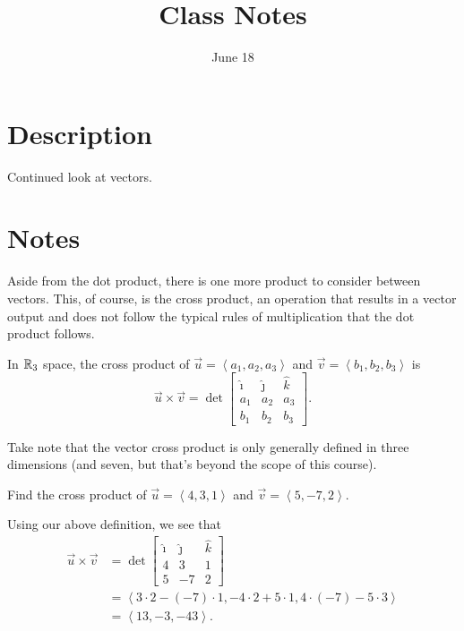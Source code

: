 \documentclass[12pt]{scrartcl}
\title{Class Notes}
\date{June 18}
\begin{document}
\maketitle

\pagebreak

\section{Description}

Continued look at vectors.

\section{Notes}

Aside from the dot product, there is one more product to consider between vectors. This, of course, is the cross product, an operation that results in a vector output and does not follow the typical rules of multiplication that the dot product follows.

\begin{definition}
    In $\mathbb R_{3}$ space, the cross product of $\vec{u} = \left<a_{1}, a_{2}, a_{3}\right>$ and $\vec{v} = \left<b_{1}, b_{2}, b_{3}\right>$ is
    \[\vec{u} \times \vec{v} = \det \begin{bmatrix} \hat{\imath} & \hat{\jmath} & \hat{k} \\ a_{1} & a_{2} & a_{3} \\ b_{1} & b_{2} & b_{3} \end{bmatrix}.\]
\end{definition}

\begin{remark}
    Take note that the vector cross product is only generally defined in three dimensions (and seven, but that's beyond the scope of this course).
\end{remark}

\begin{example}
    Find the cross product of $\vec{u} = \left<4, 3, 1\right>$ and $\vec{v} = \left<5, -7, 2\right>$.

    \begin{soln}
        Using our above definition, we see that
        \begin{align*}
            \vec{u} \times \vec{v} &= \det \begin{bmatrix}
                \hat{\imath} & \hat{\jmath} & \hat{k} \\
                4 & 3 & 1 \\
                5 & -7 & 2
            \end{bmatrix} \\
            &= \left<3 \cdot 2 - (-7) \cdot 1, -4 \cdot 2 + 5 \cdot 1, 4 \cdot (-7) - 5 \cdot 3\right> \\
            &= \left<13, -3, -43\right>.
        \end{align*}
    \end{soln}
\end{example}
\end{document}
